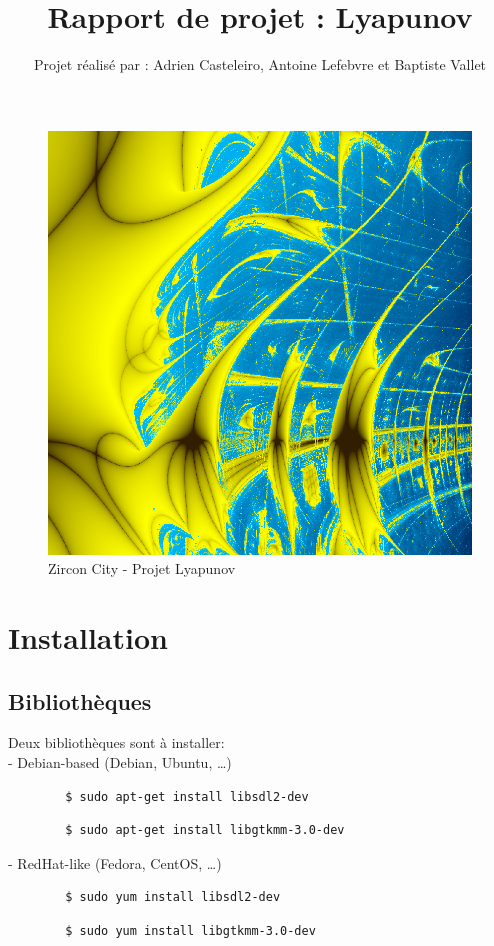 \documentclass{article}
\title{Rapport de projet : Lyapunov}
\date{}
\author{Projet réalisé par : Adrien Casteleiro, Antoine Lefebvre et Baptiste Vallet}
\begin{document}
	\vspace*{-2pt}
	{\let\newpage\relax\maketitle} \thispagestyle{fancy}
	\begin{figure}[!h]
		\centering
		\includegraphics[scale=0.3]{zircon.png}
		\caption{Zircon City - Projet Lyapunov}
	\end{figure}

	\newpage

	\tableofcontents

	\newpage

	\section{Installation}

	\subsection{Bibliothèques}

	\noindent Deux bibliothèques sont à installer:\\
	- Debian-based (Debian, Ubuntu, \ldots)
	\begin{lstlisting}
		$ sudo apt-get install libsdl2-dev
	\end{lstlisting}
	\begin{lstlisting}
		$ sudo apt-get install libgtkmm-3.0-dev
	\end{lstlisting}
	- RedHat-like (Fedora, CentOS, \ldots)
	\begin{lstlisting}
		$ sudo yum install libsdl2-dev
	\end{lstlisting}
	\begin{lstlisting}
		$ sudo yum install libgtkmm-3.0-dev
	\end{lstlisting}
\end{document}
